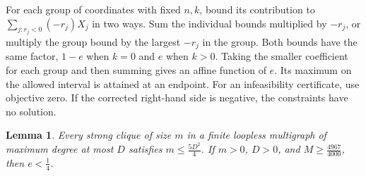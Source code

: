 \documentclass[preprint,11pt,numbers]{elsarticle-arxiv}
\numberwithin{equation}{section}
\newtheorem{lemma}[theorem]{Lemma}
\theoremstyle{definition}
\begin{document}
For each group of coordinates with fixed $n,k$, bound its
contribution to $\sum_{j:r_j<0}(-r_j)X_j$ in two ways. Sum the
individual bounds multiplied by $-r_j$, or multiply the group
bound by the largest $-r_j$ in the group. Both bounds have the
same factor, $1-e$ when $k=0$ and $e$ when $k>0$. Taking the
smaller coefficient for each group and then summing gives an
affine function of $e$. Its maximum on the allowed interval is
attained at an endpoint. For an infeasibility certificate, use
objective zero. If the corrected right-hand side is negative,
the constraints have no solution.
\relax\space%

\begin{lemma}\label{prop:multi-uniform}
Every strong clique of size $m$ in a finite loopless multigraph of maximum
degree at most $D$ satisfies $m\le\frac{5D^2}{4}$. If $m>0$, $D>0$, and
$M\ge\frac{4967}{4000}$,
then $e<\frac{1}{4}$.
\end{lemma}
\end{document}
